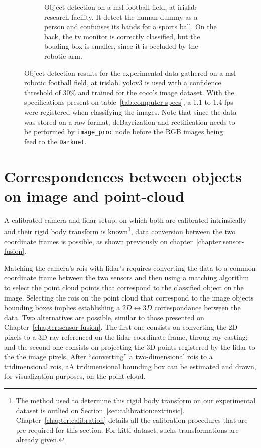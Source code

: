 \begin{figure}[ht]
\begin{subfigure}[t]{0.45\textwidth}
		\caption{Object detection on a \ac{msl} football field, at \ac{irislab} research facility.  It detect the human dummy as a person and confunses its hands for a sports ball. On the back, the tv monitor is correctly classified, but the bouding box is smaller, since it is occluded by the robotic arm.}
		\label{fig:experimental-yolo-2}
	\end{subfigure}
	\caption{Object detection results for the experimental data gathered on a \ac{msl} robotic football field, at \ac{irislab}. \ac{yolo}v3 is used with a confidence threshold of 30\% and trained for the \ac{coco}'s image dataset. With the specifications present on table~\ref{tab:computer-specs}, a 1.1 to 1.4 \ac{fps} were registered when classifying the images. Note that since the data was stored on a raw format, deBayrization and rectification needs to be performed by \texttt{image\_proc} node before the RGB images being feed to the \texttt{Darknet}.}
	\label{fig:experimental-object-detection}
\end{figure}


\section{Correspondences between objects on image and point-cloud}
A calibrated camera and \ac{lidar} setup, on which both are calibrated intrinsically and their rigid body transform is known\footnote{The method used to determine this rigid body transform on our experimental dataset is outlied on Section~\ref{sec:calibration:extrinsic}. Chapter~\ref{chapter:calibration} details all the calibration procedures that are pre-required for this section. For \ac{kitti} dataset, suchs transformations are already given.}, data conversion between the two coordinate frames is possible, as shown previously on chapter~\ref{chapter:sensor-fusion}. 

Matching the camera's \acp{roi} with \ac{lidar}'s requires converting the data to a common coordinate frame between the two sensors and then using a matching algorithm to select the point cloud points that correspond to the classified object on the image. Selecting the \acp{roi} on the point cloud that correspond to the image objects bounding boxes implies establishing a $2D \leftrightarrow 3D$ correspondance between the data. Two alternatives are possible, similar to those presented on Chapter~\ref{chapter:sensor-fusion}. The first one consists on converting the 2D pixels to a 3D ray referenced on the \ac{lidar} coordinate frame, throug ray-casting; and the second one consists on projecting the 3D points registered by the \ac{lidar} to the the image pixels. After ``converting'' a two-dimensional \acp{roi} to a tridimensional \acp{roi}, aA tridimensional bounding box can be estimated and drawn, for visualization purposes, on the point cloud. 

